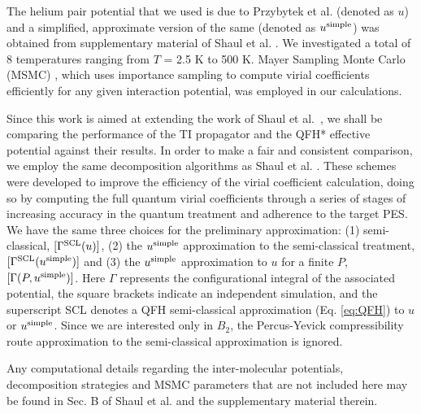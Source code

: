     The \abinitio{} helium pair potential that we used is due to Przybytek et al. \cite{Przybytek2010} (denoted as $u$) and a simplified, approximate version of the same (denoted as $u^{\rm simple}$) was obtained from supplementary material of Shaul et al. \cite{Shaul2012}. We investigated a total of 8 temperatures ranging from $T$ = 2.5 K to 500 K. Mayer Sampling Monte Carlo (MSMC) \cite{Singh2004,Schultz2009}, which uses importance sampling to compute virial coefficients efficiently for any given interaction potential, was employed in our calculations.

    Since this work is aimed at extending the work of Shaul et al.~\cite{Shaul2012}, we shall be comparing the performance of the TI propagator and the QFH* effective potential against their results. In order to make a fair and consistent comparison, we employ the same decomposition algorithms as Shaul et al. \cite{Shaul2012}. These schemes were developed to improve the efficiency of the virial coefficient calculation, doing so by computing the full quantum virial coefficients through a series of stages of increasing accuracy in the quantum treatment and adherence to the target PES. We have the same three choices for the preliminary approximation: (1) semi-classical, $[\Gamma^{\rm SCL}(u)]$, (2) the $u^{\rm simple}$ approximation to the semi-classical treatment, $[\Gamma^{\rm SCL}(u^{\rm simple})]$ and (3) the $u^{\rm simple}$ approximation to $u$ for a finite $P$, $[\Gamma (P,u^{\rm simple})]$. Here $\Gamma$ represents the configurational integral of the associated potential, the square brackets indicate an independent simulation, and the superscript SCL denotes a QFH semi-classical approximation (Eq. \eqref{eq:QFH}) to $u$ or $u^{\rm simple}$. Since we are interested only in $B_2$, the Percus-Yevick compressibility route approximation\cite{Percus1958,Hansen,Shaul2011} to the semi-classical approximation is ignored.

    Any computational details regarding the inter-molecular potentials, decomposition strategies and MSMC parameters that are not included here may be found in Sec. B of Shaul et al. \cite{Shaul2012} and the supplementary material therein.
